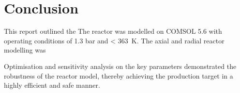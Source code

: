 \section{Conclusion} \label{sec:conclusion}
This report outlined the 
The reactor was modelled on COMSOL 5.6 with operating conditions of 1.3 bar and \SI{< 363}{\K}.
The axial and radial reactor modelling was 

Optimisation and sensitivity analysis on the key parameters demonstrated the robustness of the reactor model, thereby achieving the production target in a highly efficient and safe manner. 